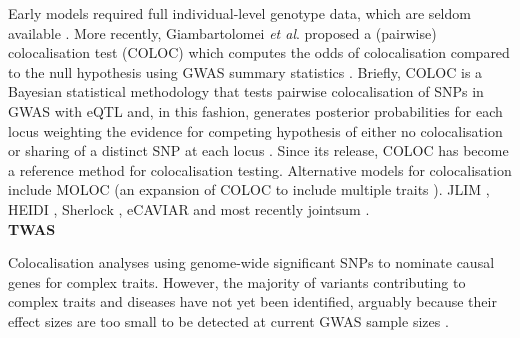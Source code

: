Early models \cite{plagnol2009statistical, wallace2012statistical, nica2010candidate} required full individual-level genotype data, which are seldom available \cite{cano2020gwas}.
More recently, Giambartolomei \textit{et al}. proposed a (pairwise) colocalisation test (COLOC) which computes the odds of colocalisation compared to the null hypothesis using GWAS summary statistics \cite{giambartolomei2014bayesian}. 
Briefly, COLOC is a Bayesian statistical methodology that tests pairwise colocalisation of SNPs in GWAS with eQTL and, in this fashion, generates posterior probabilities for each locus weighting the evidence for competing hypothesis of either no colocalisation or sharing of a distinct SNP at each locus \cite{guo2015integration}.
Since its release, COLOC has become a reference method for colocalisation testing. 
Alternative models for colocalisation include 
MOLOC (an expansion of COLOC to include multiple traits \cite{giambartolomei2018bayesian}).
JLIM \cite{chun2017limited}, 
HEIDI \cite{zhu2016integration}, 
Sherlock \cite{he2013sherlock},
eCAVIAR \cite{hormozdiari2016colocalization} 
and most recently jointsum \cite{deng2020powerful}.\\




\textbf{TWAS}



Colocalisation analyses using genome-wide significant SNPs to nominate causal genes for complex traits. 
However, the majority of variants contributing to complex traits and diseases have not yet been identified, arguably because their effect sizes are too small to be detected at current GWAS sample sizes \cite{visscher201710}.

